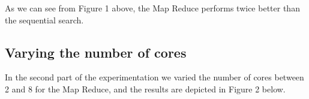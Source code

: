\documentclass[12pt]{article}
\begin{document}
 		As we can see from Figure 1 above, the Map Reduce performs twice better than the sequential search.
 		
 		\subsection{Varying the number of cores}
 		In the second part of the experimentation we varied the number of cores between 2 and 8 for the Map Reduce, and the results are depicted in Figure 2 below. 
 		
 		\begin{figure}[H]
 			\hfill
 			\hfill
 			\hfill
 			\hfill

\end{figure}
\end{document}
